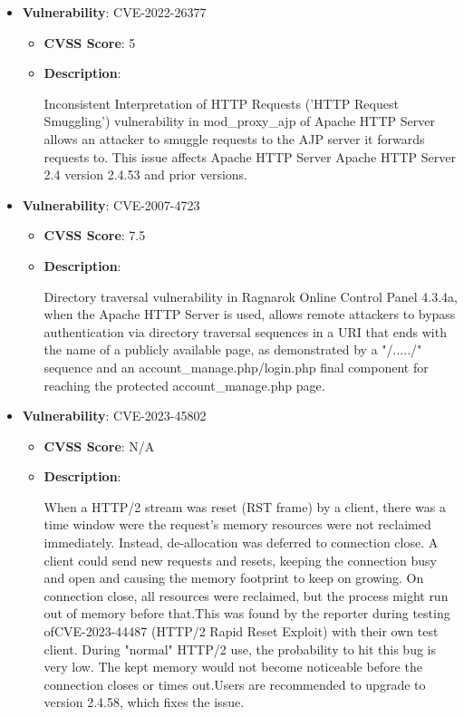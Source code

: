 \documentclass{article}
\begin{document}
\begin{itemize}
        \item \textbf{Vulnerability}: CVE-2022-26377
        \begin{itemize}
            \item \textbf{CVSS Score}:  5 
            \item \textbf{Description}:
            \parbox[t]{0.9\linewidth}{
                \ttfamily Inconsistent Interpretation of HTTP Requests ('HTTP Request Smuggling') vulnerability in mod\_proxy\_ajp of Apache HTTP Server allows an attacker to smuggle requests to the AJP server it forwards requests to. This issue affects Apache HTTP Server Apache HTTP Server 2.4 version 2.4.53 and prior versions.
            }
        \end{itemize}
    
        \item \textbf{Vulnerability}: CVE-2007-4723
        \begin{itemize}
            \item \textbf{CVSS Score}:  7.5 
            \item \textbf{Description}:
            \parbox[t]{0.9\linewidth}{
                \ttfamily Directory traversal vulnerability in Ragnarok Online Control Panel 4.3.4a, when the Apache HTTP Server is used, allows remote attackers to bypass authentication via directory traversal sequences in a URI that ends with the name of a publicly available page, as demonstrated by a "/...../" sequence and an account\_manage.php/login.php final component for reaching the protected account\_manage.php page.
            }
        \end{itemize}
    
        \item \textbf{Vulnerability}: CVE-2023-45802
        \begin{itemize}
            \item \textbf{CVSS Score}:  N/A 
            \item \textbf{Description}:
            \parbox[t]{0.9\linewidth}{
                \ttfamily When a HTTP/2 stream was reset (RST frame) by a client, there was a time window were the request's memory resources were not reclaimed immediately. Instead, de-allocation was deferred to connection close. A client could send new requests and resets, keeping the connection busy and open and causing the memory footprint to keep on growing. On connection close, all resources were reclaimed, but the process might run out of memory before that.This was found by the reporter during testing ofCVE-2023-44487 (HTTP/2 Rapid Reset Exploit) with their own test client. During "normal" HTTP/2 use, the probability to hit this bug is very low. The kept memory would not become noticeable before the connection closes or times out.Users are recommended to upgrade to version 2.4.58, which fixes the issue.
            }
        \end{itemize}
    

\end{itemize}
\end{document}
